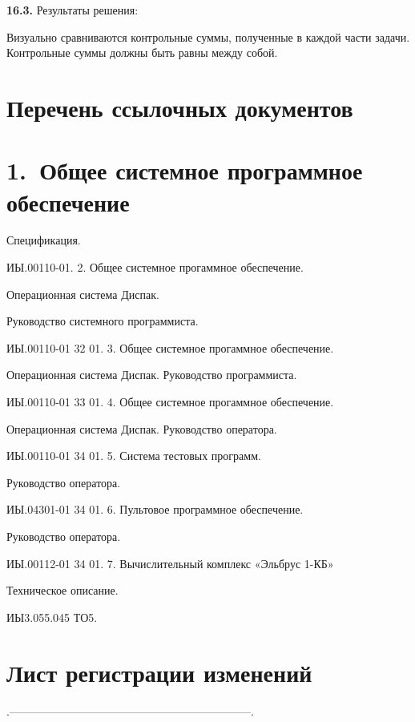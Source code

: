 \documentclass[11pt,a4paper]{article}
\begin{document}
\par\textbf{16.3.} Результаты решения:\par
Визуально сравниваются контрольные суммы, полученные в каждой части задачи. Контрольные суммы должны быть равны между собой.

\section*{Перечень ссылочных документов}
\section*{1.~Общее системное программное обеспечение}
Спецификация.

ИЫ.00110-01. 2. Общее системное прогаммное обеспечение.

Операционная система Диспак.

Руководство системного программиста.

ИЫ.00110-01 32 01. 3. Общее системное прогаммное обеспечение.

Операционная система Диспак. Руководство программиста.

ИЫ.00110-01 33 01. 4. Общее системное прогаммное обеспечение.

Операционная система Диспак. Руководство оператора.

ИЫ.00110-01 34 01. 5. Система тестовых программ.

Руководство оператора.

ИЫ.04301-01 34 01. 6. Пультовое программное обеспечение.

Руководство оператора.

ИЫ.00112-01 34 01. 7. Вычислительный комплекс «Эльбрус 1-КБ»

Техническое описание.

ИЫ3.055.045 ТО5.

\section*{Лист регистрации изменений}
.-----------------------------------------------------------------.
\end{document}
